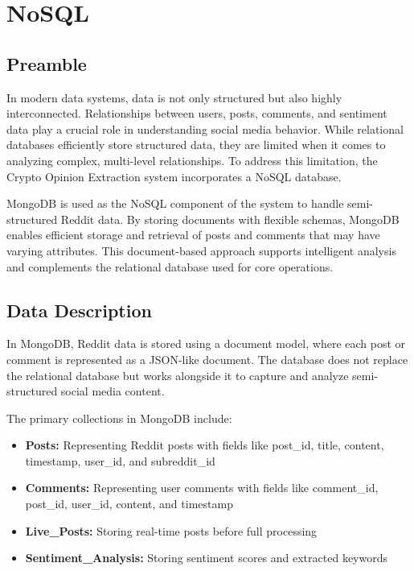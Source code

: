 
\chapter{NoSQL}

\section{Preamble}

In modern data systems, data is not only structured but also highly interconnected. Relationships between users, posts, comments, and sentiment data play a crucial role in understanding social media behavior. While relational databases efficiently store structured data, they are limited when it comes to analyzing complex, multi-level relationships. To address this limitation, the Crypto Opinion Extraction system incorporates a NoSQL database.

MongoDB is used as the NoSQL component of the system to handle semi-structured Reddit data. By storing documents with flexible schemas, MongoDB enables efficient storage and retrieval of posts and comments that may have varying attributes. This document-based approach supports intelligent analysis and complements the relational database used for core operations.

\section{Data Description}

In MongoDB, Reddit data is stored using a document model, where each post or comment is represented as a JSON-like document. The database does not replace the relational database but works alongside it to capture and analyze semi-structured social media content.

The primary collections in MongoDB include:

\begin{itemize}
    \item \textbf{Posts:} Representing Reddit posts with fields like post\_id, title, content, timestamp, user\_id, and subreddit\_id
    \item \textbf{Comments:} Representing user comments with fields like comment\_id, post\_id, user\_id, content, and timestamp
    \item \textbf{Live\_Posts:} Storing real-time posts before full processing
    \item \textbf{Sentiment\_Analysis:} Storing sentiment scores and extracted keywords
\end{itemize}

